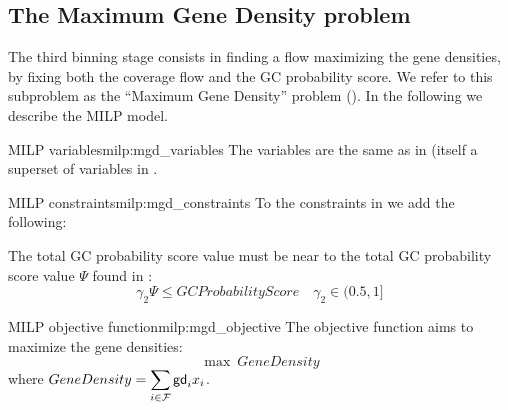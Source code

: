 \subsection{The Maximum Gene Density problem \MGD{}}\label{meth:max_gene_density}

The third binning stage consists in finding a flow maximizing the gene densities, by fixing both the coverage flow and the GC probability score.
We refer to this subproblem as the \enquote{Maximum Gene Density} problem (\MGD{}).
In the following we describe the MILP model.

\begin{definition}{\MGD{} MILP variables}{milp:mgd_variables}
    The variables are the same as in  (itself a superset of variables in .
\end{definition}


\begin{definition}{\MGC{} MILP constraints}{milp:mgd_constraints}
    To the constraints in  we add the following:

    The total GC probability score value must be near to the total GC probability score value \(\Psi\) found in \MGC{}:
    \begin{equation}
        \gamma_2 \Psi \leq GCProbabilityScore \quad \gamma_2 \in (0.5, 1]
    \end{equation}
\end{definition}

\begin{definition}{\MGC{} MILP objective function}{milp:mgd_objective}
    The objective function aims to maximize the gene densities:
    \begin{equation}
        \max ~ GeneDensity
    \end{equation}
    where \(\displaystyle GeneDensity = \sum_{i \in \mathcal{F}{}} \mathsf{gd}_{i} x_i\).
\end{definition}